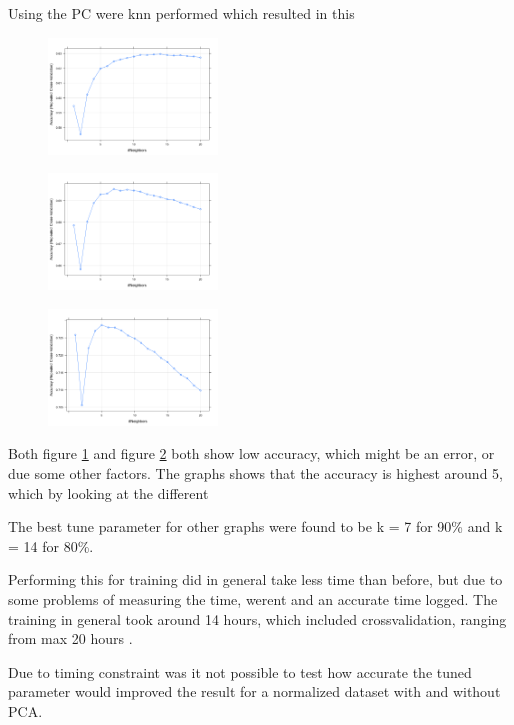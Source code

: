 Using the PC were knn performed which resulted in this

\begin{figure}[H]
\centering
\includegraphics[width = 0.4\textwidth]{graphics/kNN_plot_80.png}
\caption{}
\label{fig:knnFit_80}
\end{figure}


\begin{figure}[H]
\centering
\includegraphics[width = 0.4\textwidth]{graphics/kNN_plot_90.png}
\caption{}
\label{fig:knnFit_90}
\end{figure}


\begin{figure}[H]
\centering
\includegraphics[width = 0.4\textwidth]{graphics/kNN_plot_99.png}
\caption{}
\label{fig:knnFit_99}
\end{figure}

Both figure \ref{fig:knnFit_80} and figure \ref{fig:knnFit_90} both show low accuracy,
which might be an error, or due some other factors. 
 The graphs shows that the accuracy is highest around 5, which by looking at the different

The best tune parameter for other graphs were found to be k = 7 for 90\% and k = 14 for 80\%.



Performing this for training did in general take less time than before,
 but due to some problems of measuring the time, werent and an accurate time logged.
   The training in general took around 14 hours, which included crossvalidation, ranging from max 20 hours . 

Due to timing constraint was it not possible to test how accurate the tuned
 parameter would improved the result for a normalized dataset with and without PCA. 

